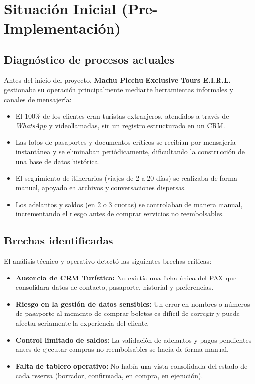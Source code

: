 \section{Situación Inicial (Pre-Implementación)}

\subsection{Diagnóstico de procesos actuales}

Antes del inicio del proyecto, \textbf{Machu Picchu Exclusive Tours E.I.R.L.} gestionaba su operación principalmente mediante herramientas informales y canales de mensajería:

\begin{itemize}
    \item El 100\% de los clientes eran turistas extranjeros, atendidos a través de \textit{WhatsApp} y videollamadas, sin un registro estructurado en un CRM.
    \item Las fotos de pasaportes y documentos críticos se recibían por mensajería instantánea y se eliminaban periódicamente, dificultando la construcción de una base de datos histórica.
    \item El seguimiento de itinerarios (viajes de 2 a 20 días) se realizaba de forma manual, apoyado en archivos y conversaciones dispersas.
    \item Los adelantos y saldos (en 2 o 3 cuotas) se controlaban de manera manual, incrementando el riesgo antes de comprar servicios no reembolsables.
\end{itemize}

\subsection{Brechas identificadas}

El análisis técnico y operativo detectó las siguientes brechas críticas:

\begin{itemize}
    \item \textbf{Ausencia de CRM Turístico:} No existía una ficha única del PAX que consolidara datos de contacto, pasaporte, historial y preferencias.
    \item \textbf{Riesgo en la gestión de datos sensibles:} Un error en nombres o números de pasaporte al momento de comprar boletos es difícil de corregir y puede afectar seriamente la experiencia del cliente.
    \item \textbf{Control limitado de saldos:} La validación de adelantos y pagos pendientes antes de ejecutar compras no reembolsables se hacía de forma manual.
    \item \textbf{Falta de tablero operativo:} No había una vista consolidada del estado de cada reserva (borrador, confirmada, en compra, en ejecución).
\end{itemize}

